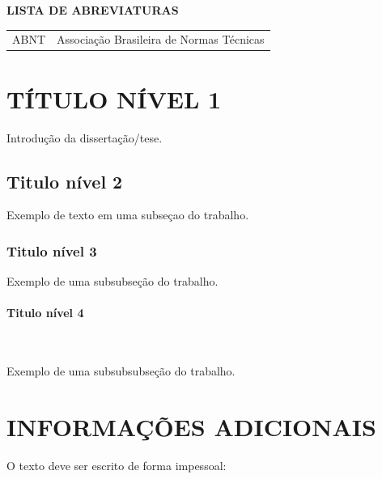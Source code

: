 \documentclass[a4paper,12pt,oneside]{article}
\numberwithin{equation}{section}
\begin{document}
\newpage
\thispagestyle{empty}
\begin{center}
	\textbf{\Large{LISTA DE ABREVIATURAS}}
\end{center}


\begin{changemargin}{1.5cm}{1.5cm} 
	\begin{tabular}{ll}
		ABNT 	&	Associação Brasileira de Normas Técnicas\\

	\end{tabular}
\end{changemargin}






\section{TÍTULO NÍVEL 1}

Introdução da dissertação/tese.


\subsection{Titulo nível 2}

Exemplo de texto em uma subseçao do trabalho.


\subsubsection{Titulo nível 3}

Exemplo de uma subsubseção do trabalho.

\paragraph{Titulo nível 4}
\ \ \

Exemplo de uma subsubsubseção do trabalho.


\section{INFORMAÇÕES ADICIONAIS}

O texto deve ser escrito de forma impessoal:\\
\end{document}

